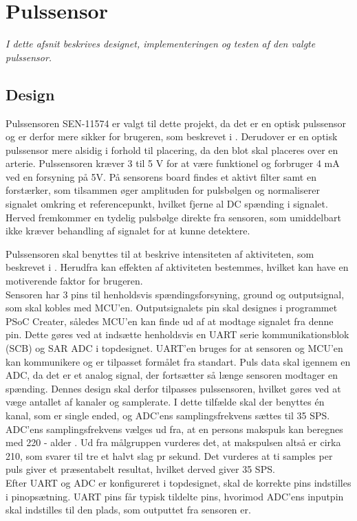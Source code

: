\section{Pulssensor}
\textit{I dette afsnit beskrives designet, implementeringen og testen af den valgte pulssensor.}

\subsection{Design}
Pulssensoren SEN-11574 er valgt til dette projekt, da det er en optisk pulssensor og er derfor mere sikker for brugeren, som beskrevet i . Derudover er en optisk pulssensor mere alsidig i forhold til placering, da den blot skal placeres over en arterie. Pulssensoren kræver 3 til 5 V for at være funktionel og forbruger 4 mA ved en forsyning på 5V. På sensorens board findes et aktivt filter samt en forstærker, som tilsammen øger amplituden for pulsbølgen og normaliserer signalet omkring et referencepunkt, hvilket fjerne al DC spænding i signalet. Herved fremkommer en tydelig pulsbølge direkte fra sensoren, som umiddelbart ikke kræver behandling af signalet for at kunne detektere. \citep{Murphy2016,Murphy2016_sensor}

Pulssensoren skal benyttes til at beskrive intensiteten af aktiviteten, som beskrevet i . Herudfra kan effekten af aktiviteten bestemmes, hvilket kan have en motiverende faktor for brugeren. \\
Sensoren har 3 pins til henholdsvis spændingsforsyning, ground og outputsignal, som skal kobles med MCU'en. Outputsignalets pin skal designes i programmet PSoC Creater, således MCU'en kan finde ud af at modtage signalet fra denne pin. Dette gøres ved at indsætte henholdsvis en UART serie kommunikationsblok (SCB) og SAR ADC i topdesignet. UART'en bruges for at sensoren og MCU'en kan kommunikere og er tilpasset formålet fra standart. Puls data skal igennem en ADC, da det er et analog signal, der fortsætter så længe sensoren modtager en spænding. Dennes design skal derfor tilpasses pulssensoren, hvilket gøres ved at væge antallet af kanaler og samplerate. I dette tilfælde skal der benyttes én kanal, som er single ended, og ADC'ens samplingsfrekvens sættes til 35 SPS. ADC'ens samplingsfrekvens vælges ud fra, at en persons makspuls kan beregnes med 220 - alder \citep{CooperBlair2005}. Ud fra målgruppen vurderes det, at makspulsen altså er cirka 210, som svarer til tre et halvt slag pr sekund. Det vurderes at ti samples per puls giver et præsentabelt resultat, hvilket derved giver 35 SPS.\\
Efter UART og ADC er konfigureret i topdesignet, skal de korrekte pins indstilles i pinopsætning. UART pins får typisk tildelte pins, hvorimod ADC'ens inputpin skal indstilles til den plads, som outputtet fra sensoren er. \\

